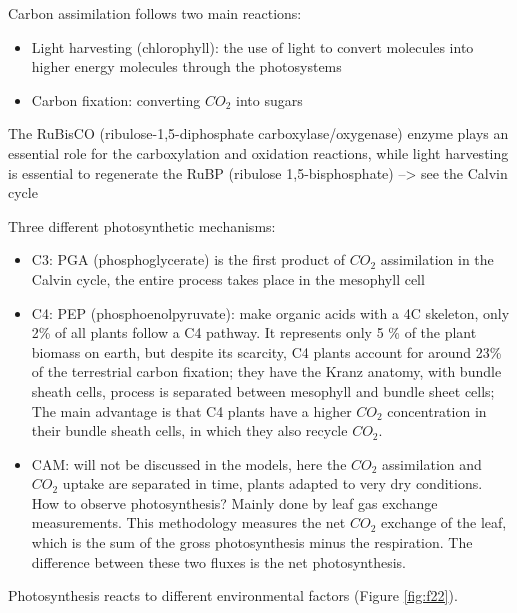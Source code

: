 \documentclass[12pt,oneside]{book}
\providecommand{\tightlist}{%
  \setlength{\itemsep}{0pt}\setlength{\parskip}{0pt}}
\begin{document}
Carbon assimilation follows two main reactions:

\begin{itemize}
\tightlist
\item
  Light harvesting (chlorophyll): the use of light to convert molecules
  into higher energy molecules through the photosystems
\item
  Carbon fixation: converting \(CO_2\) into sugars
\end{itemize}

The RuBisCO (ribulose-1,5-diphosphate carboxylase/oxygenase) enzyme
plays an essential role for the carboxylation and oxidation reactions,
while light harvesting is essential to regenerate the RuBP (ribulose
1,5-bisphosphate) --\textgreater{} see the Calvin cycle

Three different photosynthetic mechanisms:

\begin{itemize}
\tightlist
\item
  C3: PGA (phosphoglycerate) is the first product of \(CO_2\)
  assimilation in the Calvin cycle, the entire process takes place in
  the mesophyll cell
\item
  C4: PEP (phosphoenolpyruvate): make organic acids with a 4C skeleton,
  only 2\% of all plants follow a C4 pathway. It represents only 5 \% of
  the plant biomass on earth, but despite its scarcity, C4 plants
  account for around 23\% of the terrestrial carbon fixation; they have
  the Kranz anatomy, with bundle sheath cells, process is separated
  between mesophyll and bundle sheet cells; The main advantage is that
  C4 plants have a higher \(CO_2\) concentration in their bundle sheath
  cells, in which they also recycle \(CO_2\).
\item
  CAM: will not be discussed in the models, here the \(CO_2\)
  assimilation and \(CO_2\) uptake are separated in time, plants adapted
  to very dry conditions. How to observe photosynthesis? Mainly done by
  leaf gas exchange measurements. This methodology measures the net
  \(CO_2\) exchange of the leaf, which is the sum of the gross
  photosynthesis minus the respiration. The difference between these two
  fluxes is the net photosynthesis.
\end{itemize}

Photosynthesis reacts to different environmental factors (Figure
\ref{fig:f22}).
\end{document}
